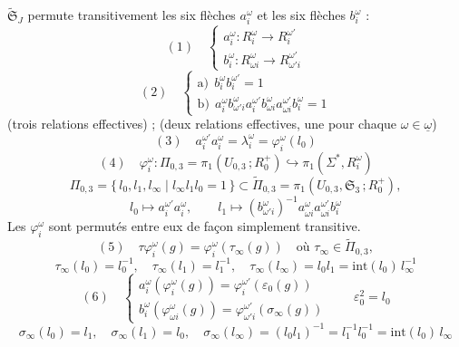 \documentclass[11pt,a4paper]{article}
\begin{document}
$\widetilde{\mathfrak{S}}_J$ permute transitivement les six flèches $a_i^{\omega}$ et les six flèches $b_i^{\omega}$ : 
\[
(1)\quad
\begin{cases}
a_i^{\omega} : R_i^{\omega} \to R_i^{\omega'} \\
b_i^{\omega} : R^{\omega}_{\omega i} \to R^{\omega'}_{\omega' i}
\end{cases}
\]
\[
(2)\quad
\begin{cases}
\text{a)}\ \ b_i^{\omega} b_i^{\omega'} = 1 \\
\text{b)}\ \ a_i^{\omega} b^{\omega}_{\omega' i} a_i^{\omega'} b^{\omega}_{\omega i} a^{\omega'}_{\omega i} b_i^{\omega} = 1
\end{cases}
\]
(trois relations effectives) ; (deux relations effectives, une pour chaque $\omega \in \underline{\omega}$)
\[
(3)\quad a_i^{\omega'} a_i^{\omega} = \lambda_i^{\omega} = \varphi_i^{\omega}(l_0)
\]
\[
(4)\quad \varphi_i^{\omega} : \Pi_{0,3} = \pi_1(U_{0,3}\,;R_0^{+}) \hookrightarrow \pi_1(\Sigma^{*}, R_i^{\omega})
\]
\[
\Pi_{0,3} = \{\, l_0, l_1, l_\infty \mid l_\infty l_1 l_0 = 1 \,\}
\subset \widetilde{\Pi}_{0,3} = \pi_1(U_{0,3}, \mathfrak{S}_3\,; R_0^{+}),
\]
\[
l_0 \mapsto a_i^{\omega'} a_i^{\omega}, \qquad
l_1 \mapsto (b^{\omega}_{\omega' i})^{-1} a^{\omega}_{\omega i} a^{\omega'}_{\omega i} b_i^{\omega}
\]
Les $\varphi_i^{\omega}$ sont permutés entre eux de façon simplement transitive.
\[
(5)\quad \tau\varphi_i^{\omega}(g) = \varphi_i^{\omega}(\tau_\infty(g)) \quad \text{où } \tau_\infty \in \widetilde{\Pi}_{0,3},
\]
\[
\tau_\infty(l_0) = l_0^{-1}, \quad \tau_\infty(l_1) = l_1^{-1}, \quad
\tau_\infty(l_\infty) = l_0 l_1 = \mathrm{int}(l_0)\, l_\infty^{-1}
\]
\[
(6)\quad
\begin{cases}
a_i^{\omega}(\varphi_i^{\omega}(g)) = \varphi_i^{\omega'}(\varepsilon_0(g)) \\
b_i^{\omega}(\varphi^{\omega}_{\omega i}(g)) = \varphi^{\omega'}_{\omega' i}(\sigma_\infty(g))
\end{cases}
\qquad \varepsilon_0^2 = l_0
\]
\[
\sigma_\infty(l_0) = l_1, \quad \sigma_\infty(l_1) = l_0, \quad
\sigma_\infty(l_\infty) = (l_0 l_1)^{-1} = l_1^{-1} l_0^{-1} = \mathrm{int}(l_0)\, l_\infty
\]
\struck{\ill{}}
\end{document}
